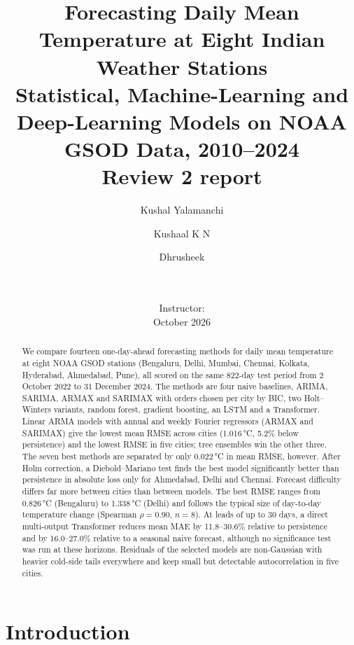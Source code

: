 \documentclass[11pt,a4paper]{article}
\title{\textbf{Forecasting Daily Mean Temperature at Eight Indian Weather Stations}\\[4pt]
\large Statistical, Machine-Learning and Deep-Learning Models on NOAA GSOD Data, 2010--2024\\[2pt]
\normalsize Review 2 report}
\author{Kushal Yalamanchi \and Kushaal K N \and Dhrusheek}
\date{%
  \ifx\CourseName\empty\else\CourseName\\\fi
  \ifx\Institution\empty\else\Institution\\\fi
  \ifx\Instructor\empty\else Instructor: \Instructor\\\fi
  October 2026}
\newcommand{\degC}{\,\si{\degreeCelsius}}
\begin{document}
\maketitle
\thispagestyle{fancy}

\begin{abstract}
\noindent
We compare fourteen one-day-ahead forecasting methods for daily mean temperature at eight NOAA GSOD stations (Bengaluru, Delhi, Mumbai, Chennai, Kolkata, Hyderabad, Ahmedabad, Pune), all scored on the same 822-day test period from 2 October 2022 to 31 December 2024. The methods are four naive baselines, ARIMA, SARIMA, ARMAX and SARIMAX with orders chosen per city by BIC, two Holt--Winters variants, random forest, gradient boosting, an LSTM and a Transformer. Linear ARMA models with annual and weekly Fourier regressors (ARMAX and SARIMAX) give the lowest mean RMSE across cities (1.016\degC, 5.2\% below persistence) and the lowest RMSE in five cities; tree ensembles win the other three. The seven best methods are separated by only 0.022\degC{} in mean RMSE, however. After Holm correction, a Diebold--Mariano test finds the best model significantly better than persistence in absolute loss only for Ahmedabad, Delhi and Chennai. Forecast difficulty differs far more between cities than between models. The best RMSE ranges from 0.826\degC{} (Bengaluru) to 1.338\degC{} (Delhi) and follows the typical size of day-to-day temperature change (Spearman $\rho = 0.90$, $n = 8$). At leads of up to 30 days, a direct multi-output Transformer reduces mean MAE by 11.8--30.6\% relative to persistence and by 16.0--27.0\% relative to a seasonal naive forecast, although no significance test was run at these horizons. Residuals of the selected models are non-Gaussian with heavier cold-side tails everywhere and keep small but detectable autocorrelation in five cities.
\end{abstract}

\section{Introduction}
\label{sec:intro}
\end{document}
